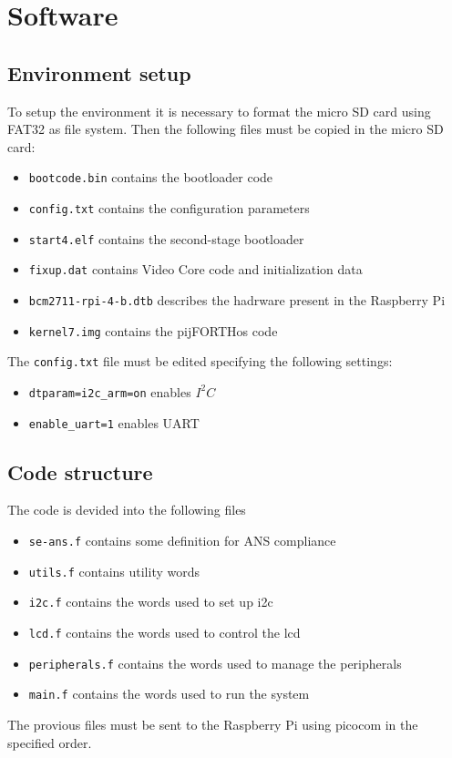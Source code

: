 \documentclass[]{article}
\begin{document}
\section{Software}

\subsection{Environment setup}
To setup the environment it is necessary to format the micro SD card using FAT32 as file system. Then the following files must be copied in the micro SD card: 
\begin{itemize}
    \item \texttt{bootcode.bin} contains the bootloader code 
    \item \texttt{config.txt} contains the configuration parameters
    \item \texttt{start4.elf} contains the second-stage bootloader 
    \item \texttt{fixup.dat} contains Video Core code and initialization data 
    \item \texttt{bcm2711-rpi-4-b.dtb} describes the hadrware present in the Raspberry Pi
    \item \texttt{kernel7.img} contains the pijFORTHos code   
\end{itemize}
The \texttt{config.txt} file must be edited specifying the following settings:
\begin{itemize}
    \item \texttt{dtparam=i2c\_arm=on} enables $ I^2C $
    \item \texttt{enable\_uart=1} enables UART 
\end{itemize}

\subsection{Code structure}
The code is devided into the following files 

\begin{itemize}
    \item \texttt{se-ans.f} contains some definition for ANS compliance 
    \item \texttt{utils.f} contains utility words
    \item \texttt{i2c.f} contains the words used to set up i2c 
    \item \texttt{lcd.f} contains the words used to control the lcd
    \item \texttt{peripherals.f} contains the words used to manage the peripherals
    \item \texttt{main.f} contains the words used to run the system 
\end{itemize}
The provious files must be sent to the Raspberry Pi using picocom in the specified order.
\end{document}
